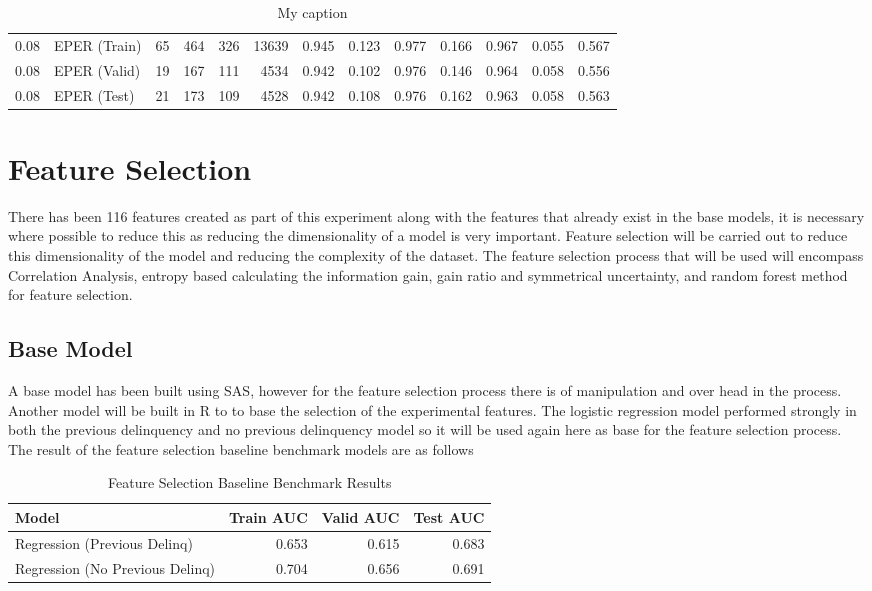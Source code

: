 \begin{table}[H]
{\begin{tabular}{l|l|r|r|r|r|r|r|r|r|r|r|r}
		0.08            & EPER (Train)    & 65          & 464         & 326         & 13639       & 0.945             & 0.123              & 0.977        & 0.166           & 0.967                & 0.055  & 0.567     \\
		0.08            & EPER (Valid)    & 19          & 167         & 111         & 4534        & 0.942             & \cellcolor{yellow!25}0.102              & 0.976        & 0.146           & 0.964                & 0.058    & 0.556   \\
		0.08            & EPER (Test)     & 21          & 173         & 109         & 4528        & 0.942             & 0.108              & 0.976        & 0.162           & 0.963                & 0.058 & 0.563     \\ \hline
	\end{tabular}
	}
	\caption{My caption}
	\label{my-label}
\end{table}

\section{Feature Selection}
There has been 116 features created as part of this experiment along with the features that already exist in the base models, it is necessary where possible to reduce this as reducing the dimensionality of a model is very important. Feature selection will be carried out to reduce this dimensionality of the model and reducing the complexity of the dataset. The feature selection process that will be used will encompass Correlation Analysis, entropy based calculating the information gain, gain ratio and symmetrical uncertainty, and random forest method for feature selection. 


\subsection{Base Model}
A base model has been built using SAS, however for the feature selection process there is of manipulation and over head in the process. Another model will be built in R to to base the selection of the experimental features. The logistic regression model performed strongly in both the previous delinquency and no previous delinquency model so it will be used again here as base for the feature selection process. The result of the feature selection baseline benchmark models are as follows 

\begin{table}[H]
	\centering
		\begin{tabular}{l | r | r| r}
			\hline
			\textbf{Model} & \textbf{Train AUC} & \textbf{Valid AUC} &  \textbf{Test AUC} \\
			\hline
			Regression (Previous Delinq) & 0.653 & 0.615 & 0.683  \\
			Regression (No Previous Delinq) & 0.704 & 0.656 & 0.691  \\
			\hline
		\end{tabular}
	\caption{Feature Selection Baseline Benchmark Results}
	\label{table:featureselection_base_model}
\end{table}


